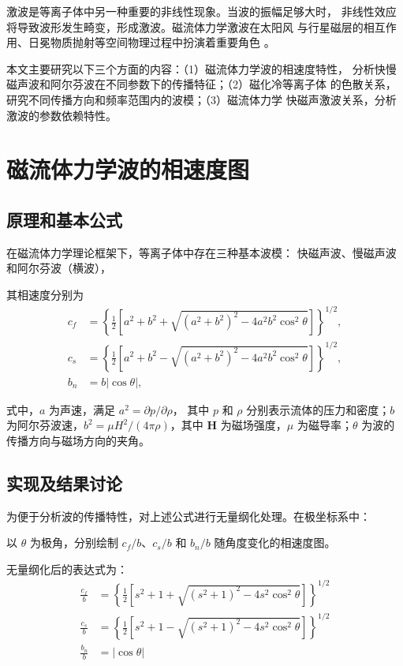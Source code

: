 \documentclass{article}
\begin{document}
激波是等离子体中另一种重要的非线性现象。当波的振幅足够大时，
非线性效应将导致波形发生畸变，形成激波。磁流体力学激波在太阳风
与行星磁层的相互作用、日冕物质抛射等空间物理过程中扮演着重要角色
\citep{Jeffrey1964}。

本文主要研究以下三个方面的内容：（1）磁流体力学波的相速度特性，
分析快慢磁声波和阿尔芬波在不同参数下的传播特征；（2）磁化冷等离子体
的色散关系，研究不同传播方向和频率范围内的波模；（3）磁流体力学
快磁声激波关系，分析激波的参数依赖特性。



\section{磁流体力学波的相速度图}
\subsection{原理和基本公式}

在磁流体力学理论框架下，等离子体中存在三种基本波模：
快磁声波、慢磁声波和阿尔芬波（横波），

其相速度分别为\citep{Jeffrey1964}
\begin{align}
c_f &= \left\{\frac{1}{2} \left[a^2 + b^2 + 
  \sqrt{(a^2 + b^2)^2 - 4 a^2 b^2
\cos^2\theta}\right]\right\}^{1/2}, \\
c_s &= \left\{\frac{1}{2} \left[a^2 + b^2 - 
  \sqrt{(a^2 + b^2)^2 - 4 a^2 b^2
\cos^2\theta}\right]\right\}^{1/2}, \\
b_n &= b \left|\cos\theta\right|,
\end{align}


式中，$a$ 为声速，满足 $a^2 = \partial p/\partial \rho$，
其中 $p$ 和 $\rho$ 分别表示流体的压力和密度；$b$ 为阿尔芬波速，$b^2 = \mu H^2/(4\pi \rho)$，其中 $\boldsymbol{H}$ 为磁场强度，$\mu$ 为磁导率；$\theta$ 为波的传播方向与磁场方向的夹角。



\subsection{实现及结果讨论}

为便于分析波的传播特性，对上述公式进行无量纲化处理。在极坐标系中：

以 $\theta$ 为极角，分别绘制 $c_f/b$、$c_s/b$ 和 $b_n/b$ 随角度变化的相速度图。

无量纲化后的表达式为：
\begin{align}
\frac{c_f}{b} &= \left\{\frac{1}{2}\left[s^2+1+
  \sqrt{(s^2+1)^2-4 s^2 \cos^2\theta}\right]\right\}^{1/2} \\
\frac{c_s}{b} &= \left\{\frac{1}{2}\left[s^2+1-
  \sqrt{(s^2+1)^2-4 s^2 \cos^2\theta}\right]\right\}^{1/2} \\
\frac{b_n}{b} &= \left|\cos \theta\right|
\end{align}
\end{document}
